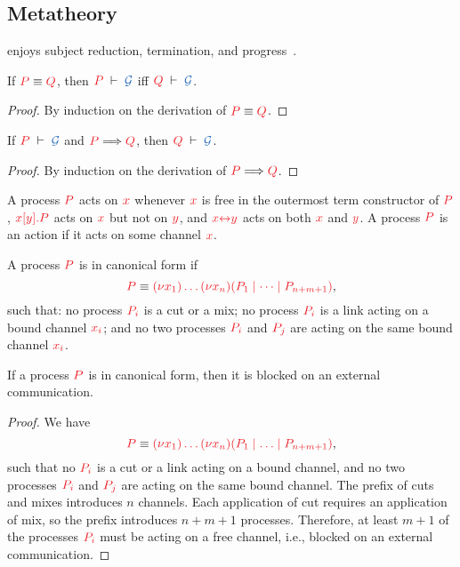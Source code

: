 \documentclass[UKenglish]{llncs}
\begin{document}
\subsection{Metatheory}
\label{sec:cp-metatheory}
\hcp enjoys subject reduction, termination, and progress~\citep{kokke2018tlla}.
\begin{lemma}\label{lem:hcp-preservation-equiv}
  If $\tm{P}\equiv\tm{Q}$, then $\seq[P]{\mathcal{G}}$ iff $\seq[Q]{\mathcal{G}}$.
\end{lemma} 
\begin{proof}
  By induction on the derivation of $\tm{P}\equiv\tm{Q}$.
\end{proof}
\begin{theorem}[Preservation]\label{thm:hcp-preservation}
  If $\seq[P]{\mathcal{G}}$ and $\reducesto{P}{Q}$, then $\seq[Q]{\mathcal{G}}$.
\end{theorem} 
\begin{proof}
  By induction on the derivation of $\reducesto{P}{Q}$.
\end{proof}
\begin{definition}[Actions]
  A process $\tm{P}$ acts on $\tm{x}$ whenever $\tm{x}$ is free in the outermost
  term constructor of $\tm{P}$, \eg $\tm{\piSend{x}{y}{P}}$ acts on $\tm{x}$
  but not on $\tm{y}$, and $\tm{\cpLink{x}{y}}$ acts on both $\tm{x}$ and $\tm{y}$.
  A process $\tm{P}$ is an action if it acts on some channel $\tm{x}$.
\end{definition}
\begin{definition}
  A process $\tm{P}$ is in canonical form if
  \[
  \tm{P} \equiv \tm{\piNew{x_1}{\dots\piNew{x_n}{(P_1 \mid \dots \mid P_{n+m+1})}}},
  \]
  such that: no process $\tm{P_i}$ is a cut or a mix; no process $\tm{P_i}$ is a link acting on a bound channel $\tm{x_i}$; and no two processes $\tm{P_i}$ and $\tm{P_j}$ are acting on the same bound channel $\tm{x_i}$.
\end{definition}
\begin{corollary}
  If a process $\tm{P}$ is in canonical form, then it is blocked on an external communication.
\end{corollary}
\begin{proof}
  We have
  \[
  \tm{P} \equiv \tm{\piNew{x_1}{\dots\piNew{x_n}{(P_1 \ppar \dots \ppar P_{n+m+1})}}},
  \]
  such that no $\tm{P_i}$ is a cut or a link acting on a bound channel, and no two processes $\tm{P_i}$ and $\tm{P_j}$ are acting on the same bound channel. The prefix of cuts and mixes introduces $n$ channels. Each application of cut requires an application of mix, so the prefix introduces $n+m+1$ processes. Therefore, at least $m+1$ of the processes $\tm{P_i}$ must be acting on a free channel, i.e., blocked on an external communication.
\end{proof}
\end{document}
